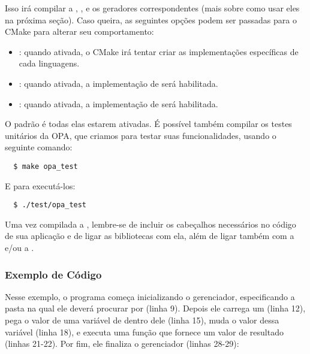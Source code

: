 Isso irá compilar a , ,  e 
os geradores correspondentes (mais sobre como usar eles na próxima seção). Caso queira, as
seguintes opções podem ser passadas para o CMake para alterar seu comportamento:

\begin{itemize}
  \item {}: quando ativada, o CMake irá tentar criar as 
    implementações específicas de cada linguagens.
  \item {}: quando ativada, a implementação de  será 
    habilitada.
  \item {}: quando ativada, a implementação de 
    será habilitada.
\end{itemize}

O padrão é todas elas estarem ativadas. É possível também compilar os testes unitários da
OPA, que criamos para testar suas funcionalidades, usando o seguinte comando:

\begin{verbatim}
  $ make opa_test
\end{verbatim}

E para executá-los:

\begin{verbatim}
  $ ./test/opa_test
\end{verbatim}

Uma vez compilada a , lembre-se de incluir os cabeçalhos necessários
no código de sua aplicação e de ligar as bibliotecas com ela, além de ligar também
com a  e/ou a .
    
\subsubsection{Exemplo de Código} 
Nesse exemplo, o programa começa inicializando o gerenciador, especificando a pasta na qual
ele deverá procurar por  (linha 9). Depois ele carrega um \script{} (linha 12),
pega o valor de uma variável de dentro dele (linha 15), muda o valor dessa variável (linha 18),
e executa uma função que fornece um valor de resultado (linhas 21-22). Por fim, ele finaliza o
gerenciador (linhas 28-29):
    
